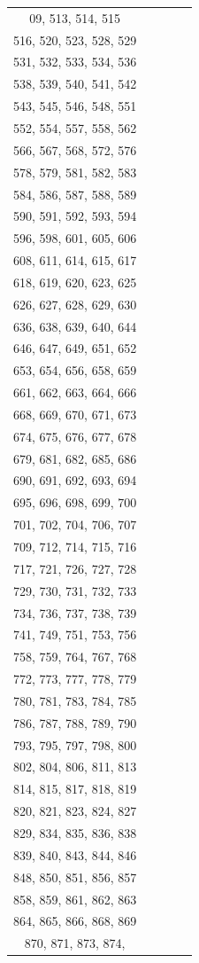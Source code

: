 \documentclass{article}
\begin{document}
\begin{table}[h]
\begin{tabular}{c|c|c|c|c}
09, 513, 514, 515\\516, 520, 523, 528, 529\\531, 532, 533, 534, 536\\538, 539, 540, 541, 542\\543, 545, 546, 548, 551\\552, 554, 557, 558, 562\\566, 567, 568, 572, 576\\578, 579, 581, 582, 583\\584, 586, 587, 588, 589\\590, 591, 592, 593, 594\\596, 598, 601, 605, 606\\608, 611, 614, 615, 617\\618, 619, 620, 623, 625\\626, 627, 628, 629, 630\\636, 638, 639, 640, 644\\646, 647, 649, 651, 652\\653, 654, 656, 658, 659\\661, 662, 663, 664, 666\\668, 669, 670, 671, 673\\674, 675, 676, 677, 678\\679, 681, 682, 685, 686\\690, 691, 692, 693, 694\\695, 696, 698, 699, 700\\701, 702, 704, 706, 707\\709, 712, 714, 715, 716\\717, 721, 726, 727, 728\\729, 730, 731, 732, 733\\734, 736, 737, 738, 739\\741, 749, 751, 753, 756\\758, 759, 764, 767, 768\\772, 773, 777, 778, 779\\780, 781, 783, 784, 785\\786, 787, 788, 789, 790\\793, 795, 797, 798, 800\\802, 804, 806, 811, 813\\814, 815, 817, 818, 819\\820, 821, 823, 824, 827\\829, 834, 835, 836, 838\\839, 840, 843, 844, 846\\848, 850, 851, 856, 857\\858, 859, 861, 862, 863\\864, 865, 866, 868, 869\\870, 871, 873, 874, 
\end{tabular}
\end{table}
\end{document}
